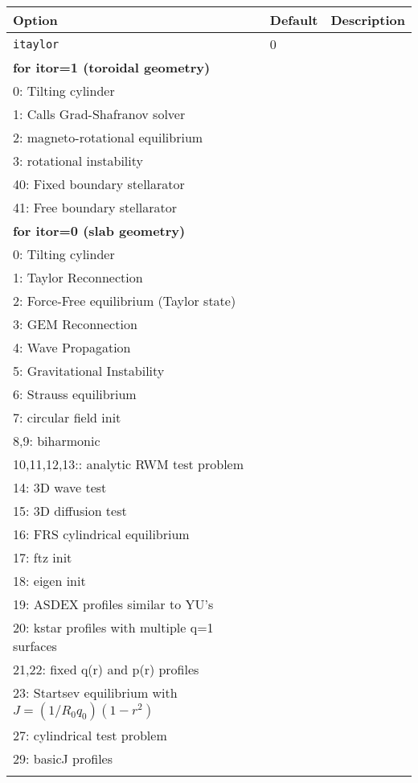 \begin{tabular}{llp{4in}}
  \textbf{Option}&\textbf{Default}&\textbf{Description}\\
  \hline
  \texttt{itaylor} & 0 & \begin{minipage}[t]{2.5in}
    Pre-defined initial conditions.\\
 {\bf for itor=1 (toroidal geometry)} \\ 
    0: Tilting cylinder \\
    1: Calls Grad-Shafranov solver \\
    2: magneto-rotational equilibrium \\
    3: rotational instability \\   
    40: Fixed boundary stellarator \\
    41: Free boundary stellarator \\
 {\bf for itor=0 (slab geometry) } \\
    0: Tilting cylinder\\
    1: Taylor Reconnection\\
    2: Force-Free equilibrium (Taylor state) \\
    3: GEM Reconnection\\
    4: Wave Propagation\\
    5: Gravitational Instability\\
    6: Strauss equilibrium \\
    7: circular field init \\
    8,9:  biharmonic \\
    10,11,12,13:: analytic RWM test problem \\
    14: 3D wave test \\
    15: 3D diffusion test \\
    16:  FRS cylindrical equilibrium \\
    17:  ftz init \\
    18:  eigen init \\
    19:  ASDEX profiles similar to YU's \\
    20: kstar profiles with multiple q=1 surfaces \\
    21,22: fixed q(r) and p(r) profiles \\
    23:  Startsev equilibrium with $ J = (1/R_0q_0)(1 - r^2)$ \\
    27:  cylindrical test problem \\
    29:  basicJ profiles \\
  \end{minipage}\\

\end{tabular}
